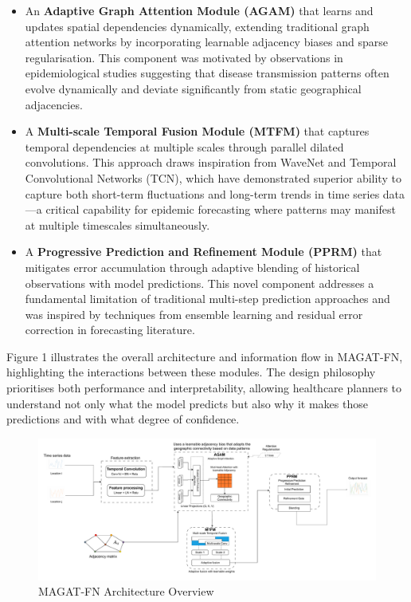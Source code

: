 \documentclass[lettersize, journal]{IEEEtran}
\begin{document}
\begin{itemize}
    \item An \textbf{Adaptive Graph Attention Module (AGAM)} that learns and updates spatial dependencies dynamically, extending traditional graph attention networks by incorporating learnable adjacency biases and sparse regularisation. This component was motivated by observations in epidemiological studies suggesting that disease transmission patterns often evolve dynamically and deviate significantly from static geographical adjacencies.
    
    \item A \textbf{Multi-scale Temporal Fusion Module (MTFM)} that captures temporal dependencies at multiple scales through parallel dilated convolutions. This approach draws inspiration from WaveNet and Temporal Convolutional Networks (TCN), which have demonstrated superior ability to capture both short-term fluctuations and long-term trends in time series data—a critical capability for epidemic forecasting where patterns may manifest at multiple timescales simultaneously.
    
    \item A \textbf{Progressive Prediction and Refinement Module (PPRM)} that mitigates error accumulation through adaptive blending of historical observations with model predictions. This novel component addresses a fundamental limitation of traditional multi-step prediction approaches and was inspired by techniques from ensemble learning and residual error correction in forecasting literature.
\end{itemize}

Figure 1 illustrates the overall architecture and information flow in MAGAT-FN, highlighting the interactions between these modules. The design philosophy prioritises both performance and interpretability, allowing healthcare planners to understand not only what the model predicts but also why it makes those predictions and with what degree of confidence.


\begin{figure}[ht]
\centering
\includegraphics[width=\textwidth]{../figures/GNN-architecture.pdf}
\caption{MAGAT-FN Architecture Overview}
\label{fig:architecture}
\end{figure}
\end{document}
